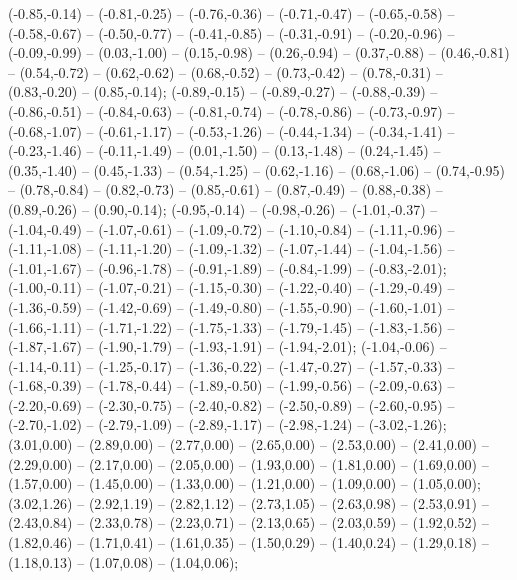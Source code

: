 {   (-0.85,-0.14) -- (-0.81,-0.25) -- (-0.76,-0.36) -- (-0.71,-0.47) -- (-0.65,-0.58) -- (-0.58,-0.67) -- (-0.50,-0.77) -- (-0.41,-0.85) -- (-0.31,-0.91) -- (-0.20,-0.96) -- (-0.09,-0.99) -- (0.03,-1.00) -- (0.15,-0.98) -- (0.26,-0.94) -- (0.37,-0.88) -- (0.46,-0.81) -- (0.54,-0.72) -- (0.62,-0.62) -- (0.68,-0.52) -- (0.73,-0.42) -- (0.78,-0.31) -- (0.83,-0.20) -- (0.85,-0.14);
   (-0.89,-0.15) -- (-0.89,-0.27) -- (-0.88,-0.39) -- (-0.86,-0.51) -- (-0.84,-0.63) -- (-0.81,-0.74) -- (-0.78,-0.86) -- (-0.73,-0.97) -- (-0.68,-1.07) -- (-0.61,-1.17) -- (-0.53,-1.26) -- (-0.44,-1.34) -- (-0.34,-1.41) -- (-0.23,-1.46) -- (-0.11,-1.49) -- (0.01,-1.50) -- (0.13,-1.48) -- (0.24,-1.45) -- (0.35,-1.40) -- (0.45,-1.33) -- (0.54,-1.25) -- (0.62,-1.16) -- (0.68,-1.06) -- (0.74,-0.95) -- (0.78,-0.84) -- (0.82,-0.73) -- (0.85,-0.61) -- (0.87,-0.49) -- (0.88,-0.38) -- (0.89,-0.26) -- (0.90,-0.14);
   (-0.95,-0.14) -- (-0.98,-0.26) -- (-1.01,-0.37) -- (-1.04,-0.49) -- (-1.07,-0.61) -- (-1.09,-0.72) -- (-1.10,-0.84) -- (-1.11,-0.96) -- (-1.11,-1.08) -- (-1.11,-1.20) -- (-1.09,-1.32) -- (-1.07,-1.44) -- (-1.04,-1.56) -- (-1.01,-1.67) -- (-0.96,-1.78) -- (-0.91,-1.89) -- (-0.84,-1.99) -- (-0.83,-2.01);
   (-1.00,-0.11) -- (-1.07,-0.21) -- (-1.15,-0.30) -- (-1.22,-0.40) -- (-1.29,-0.49) -- (-1.36,-0.59) -- (-1.42,-0.69) -- (-1.49,-0.80) -- (-1.55,-0.90) -- (-1.60,-1.01) -- (-1.66,-1.11) -- (-1.71,-1.22) -- (-1.75,-1.33) -- (-1.79,-1.45) -- (-1.83,-1.56) -- (-1.87,-1.67) -- (-1.90,-1.79) -- (-1.93,-1.91) -- (-1.94,-2.01);
   (-1.04,-0.06) -- (-1.14,-0.11) -- (-1.25,-0.17) -- (-1.36,-0.22) -- (-1.47,-0.27) -- (-1.57,-0.33) -- (-1.68,-0.39) -- (-1.78,-0.44) -- (-1.89,-0.50) -- (-1.99,-0.56) -- (-2.09,-0.63) -- (-2.20,-0.69) -- (-2.30,-0.75) -- (-2.40,-0.82) -- (-2.50,-0.89) -- (-2.60,-0.95) -- (-2.70,-1.02) -- (-2.79,-1.09) -- (-2.89,-1.17) -- (-2.98,-1.24) -- (-3.02,-1.26);
   (3.01,0.00) -- (2.89,0.00) -- (2.77,0.00) -- (2.65,0.00) -- (2.53,0.00) -- (2.41,0.00) -- (2.29,0.00) -- (2.17,0.00) -- (2.05,0.00) -- (1.93,0.00) -- (1.81,0.00) -- (1.69,0.00) -- (1.57,0.00) -- (1.45,0.00) -- (1.33,0.00) -- (1.21,0.00) -- (1.09,0.00) -- (1.05,0.00);
   (3.02,1.26) -- (2.92,1.19) -- (2.82,1.12) -- (2.73,1.05) -- (2.63,0.98) -- (2.53,0.91) -- (2.43,0.84) -- (2.33,0.78) -- (2.23,0.71) -- (2.13,0.65) -- (2.03,0.59) -- (1.92,0.52) -- (1.82,0.46) -- (1.71,0.41) -- (1.61,0.35) -- (1.50,0.29) -- (1.40,0.24) -- (1.29,0.18) -- (1.18,0.13) -- (1.07,0.08) -- (1.04,0.06);
}
